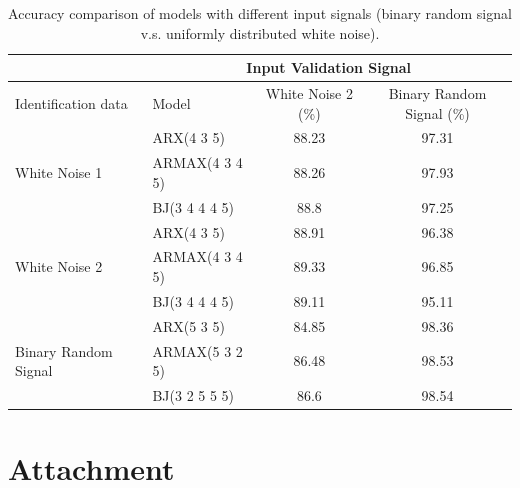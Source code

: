 \documentclass[10pt,a4paper]{article}
\begin{document}
	\begin{table}[ht]
		\footnotesize
		\centering
		\caption{Accuracy comparison of models with different input signals (binary random signal v.s. uniformly distributed white noise).}
		\label{table:accuracyComparison}
		\begin{tabular}{|l|l|c|c|}
		\hline
		& \multicolumn{3}{c|}{Input Validation Signal} \\
		\hline
		Identification data	& Model & White Noise 2 (\%) & Binary Random Signal (\%) \\
		\hline
		\multirow{3}{*}{White Noise 1} & ARX(4 3 5) & 88.23 & 97.31 \\
		& ARMAX(4 3 4 5) & 88.26 & 97.93 \\
		& BJ(3 4 4 4 5) & 88.8 & 97.25 \\
		\hline
		\multirow{3}{*}{White Noise 2} & ARX(4 3 5) & 88.91 & 96.38 \\
		& ARMAX(4 3 4 5) & 89.33 & 96.85 \\
		& BJ(3 4 4 4 5) & 89.11 & 95.11 \\
		\hline
		\multirow{3}{*}{Binary Random Signal} & ARX(5 3 5) & 84.85 & 98.36 \\
		& ARMAX(5 3 2 5) & 86.48 & 98.53 \\
		& BJ(3 2 5 5 5) & 86.6 & 98.54 \\
		\hline
		\end{tabular}
	\end{table}
\newpage
\section{Attachment}
	\label{matlabCode}
    
	
	
	
\end{document}
